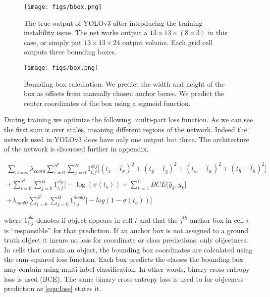 \bigskip
\begin{figure}[!htbp]
  \centering
  \texttt{[image: figs/bbox.png]}
  \caption[The true output of YOLOv3]{The true output of YOLOv3 after introducing the training instability issue. The net works output a $ 13 \times 13 \times (8 \times 3)$ in this case, or simply put $13 \times 13 \times 24$ output volume. Each grid cell outputs three bounding boxes.}\label{fig:true_yolo_output}
\end{figure}

\begin{figure}[H]
  \centering
  \texttt{[image: figs/box.png]}
  \caption[Bounding box calculation]{Bounding box calculation. We predict the width and height of the box as offsets from manually chosen anchor boxes. We predict the center
    coordinates of the box using a sigmoid function.}\label{fig:bbox_calculation}
\end{figure}

During training we optimize the following, multi-part loss function. As we can see the first sum is over scales, meaning different regions of the network. Indeed the network used in YOLOv3 does have only one output but three. The architecture of the network is discussed further in appendix.

\begin{multline}
  \label{equ:loss}
  \sum_{scales} \lambda_{coord} \sum_{i=0}^{S^2}  \sum_{j=0}^{B} {1}^{obj}_{i,j}  \big[ (t_x - \hat{t}_x)^2  +  (t_y - \hat{t}_y)^2  +  (t_w - \hat{t}_w)^2  +  (t_h - \hat{t}_h)^2  \big] \\
+ \sum_{i=0}^{S^2}  \sum_{j=0}^{B} {1}^{obj}_{i,j} \big[ - \log(\sigma(t_o))  + \sum_{k=1}^{C} BCE(\hat{y}_k, y_k \big]   \\
+ \lambda_{noobj} \sum_{i=0}^{S^2}  \sum_{j=0}^{B} {1}^{noobj}_{i,j}  \big[ -log(1-\sigma(t_o))  \big]
\end{multline}

where $1^{obi}_{i, j}$ denotes if object appears in cell $i$ and that the $j^{th}$ anchor box in cell $i$ is “responsible” for that prediction.
If an anchor box is not assigned to a ground truth object it incurs no loss for coordinate or class predictions, only objectness.
In cells that contain an object, the bounding box coordinates are calculated using the sum-squared loss function.
Each box predicts the classes the bounding box may contain using multi-label classification. In other words, binary cross-entropy loss is used (BCE).
The same binary cross-entropy loss is used to for objecness prediction as \cref{equ:loss} states it.

